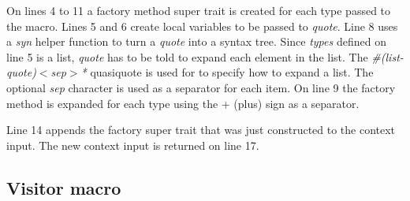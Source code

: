 On lines 4 to 11 a factory method super trait is created for each type passed to the macro.
Lines 5 and 6 create local variables to be passed to \textit{quote}.
Line 8 uses a \textit{syn} helper function to turn a \textit{quote} into a syntax tree.
Since \textit{types} defined on line 5 is a list, \textit{quote} has to be told to expand each element in the list.
The \textit{\#(list-quote)$<$sep$>$*} quasiquote is used for to specify how to expand a list.
The optional \textit{sep} character is used as a separator for each item.
On line 9 the factory method is expanded for each type using the + (plus) sign as a separator.

Line 14 appends the factory super trait that was just constructed to the context input.
The new context input is returned on line 17.

\subsection{Visitor macro}